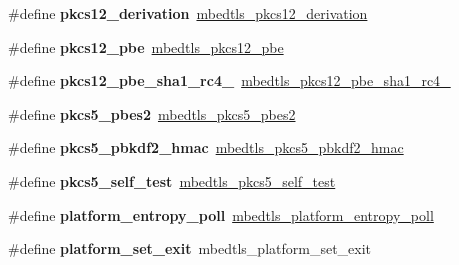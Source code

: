 \begin{DoxyCompactItemize}
\mbox{\label{compat-1_83_8h_a4e88b1aa060e1ea46b59d1ac32e0e44e}} 
\#define {\bfseries pkcs12\+\_\+derivation}~\mbox{\hyperlink{pkcs12_8h_a5e58a53e1f2194583f1e48fc2ffef627}{mbedtls\+\_\+pkcs12\+\_\+derivation}}
\item 
\mbox{\label{compat-1_83_8h_a129763a606ac988ffd714cc1fd8fc72a}} 
\#define {\bfseries pkcs12\+\_\+pbe}~\mbox{\hyperlink{pkcs12_8h_aeca4c569f386fd7ece7fcfb4efc95a29}{mbedtls\+\_\+pkcs12\+\_\+pbe}}
\item 
\mbox{\label{compat-1_83_8h_a34d3ecf684d2debd07279b324ec921e0}} 
\#define {\bfseries pkcs12\+\_\+pbe\+\_\+sha1\+\_\+rc4\+\_}~\mbox{\hyperlink{pkcs12_8h_af865b866a1e1b6f5513f5904f1fdf2fa}{mbedtls\+\_\+pkcs12\+\_\+pbe\+\_\+sha1\+\_\+rc4\+\_}}
\item 
\mbox{\label{compat-1_83_8h_aca6e0bd5c314dfe0ac578c46e762db2f}} 
\#define {\bfseries pkcs5\+\_\+pbes2}~\mbox{\hyperlink{pkcs5_8h_aaeb7b4b406e07afe3d8aa807a30d28cd}{mbedtls\+\_\+pkcs5\+\_\+pbes2}}
\item 
\mbox{\label{compat-1_83_8h_a787b14965ff5560bc37f7e028bb770fd}} 
\#define {\bfseries pkcs5\+\_\+pbkdf2\+\_\+hmac}~\mbox{\hyperlink{pkcs5_8h_a73ec933de2a4f010604b525640338b1e}{mbedtls\+\_\+pkcs5\+\_\+pbkdf2\+\_\+hmac}}
\item 
\mbox{\label{compat-1_83_8h_a2f9ccfccd5a3e1a114e27fabcc66da54}} 
\#define {\bfseries pkcs5\+\_\+self\+\_\+test}~\mbox{\hyperlink{pkcs5_8h_a918e7f20c7ad1204980e7ec69869deb3}{mbedtls\+\_\+pkcs5\+\_\+self\+\_\+test}}
\item 
\mbox{\label{compat-1_83_8h_a2aca9542b82586e3273dc433b3f26256}} 
\#define {\bfseries platform\+\_\+entropy\+\_\+poll}~\mbox{\hyperlink{entropy__poll_8h_add93967cb361ce9758800ba5a2017528}{mbedtls\+\_\+platform\+\_\+entropy\+\_\+poll}}
\item 
\mbox{\label{compat-1_83_8h_a0df6e9c9a79c861a93b257844fb2a2c8}} 
\#define {\bfseries platform\+\_\+set\+\_\+exit}~mbedtls\+\_\+platform\+\_\+set\+\_\+exit
\item 
\mbox{\label{compat-1_83_8h_a5b682dc202e4488443f963f441164f0d}} 

\end{DoxyCompactItemize}

